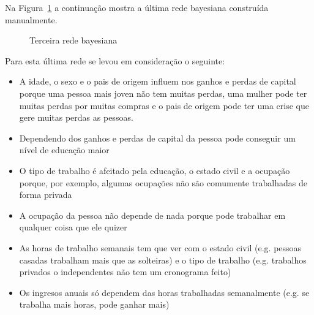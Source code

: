 	Na Figura~\ref{fig:rede3} a continuação mostra a última rede bayesiana construída manualmente.
	\begin{figure}[H]
		\centering
		
		\caption{Terceira rede bayesiana}
		\label{fig:rede3}
	\end{figure}
	Para esta última rede se levou em consideração o seguinte:
	\begin{itemize}
		\item A idade, o sexo e o pais de origem influem nos ganhos e perdas de capital porque uma pessoa mais joven não tem muitas perdas, uma mulher pode ter muitas perdas por muitas compras e o pais de origem pode ter uma crise que gere muitas perdas as pessoas.
		\item Dependendo dos ganhos e perdas de capital da pessoa pode conseguir um nível de educação maior
		\item O tipo de trabalho é afeitado pela educação, o estado civil e a ocupação porque, por exemplo, algumas ocupações não são comumente trabalhadas de forma privada
		\item A ocupação da pessoa não depende de nada porque pode trabalhar em qualquer coisa que ele quizer
		\item As horas de trabalho semanais tem que ver com o estado civil (e.g. pessoas casadas trabalham mais que as solteiras) e o tipo de trabalho (e.g. trabalhos privados o independentes não tem um cronograma feito)
		\item Os ingresos anuais só dependem das horas trabalhadas semanalmente (e.g. se trabalha mais horas, pode ganhar mais)
	\end{itemize}
	
\clearpage